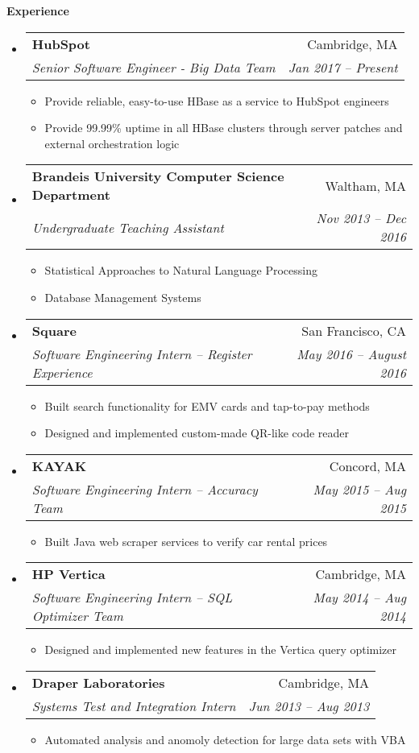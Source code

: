 \documentclass[letterpaper,11pt]{article}
\makeatletter
\newcommand{\resitem}[1]{\item #1 \vspace{-2pt}}
\newcommand{\resheading}[1]{{\large \colorbox{mygrey}{\begin{minipage}{\textwidth}{\textbf{#1 \vphantom{p\^{E}}}}\end{minipage}}}}
\newcommand{\ressubheading}[4]{
\begin{tabular*}{6.5in}{l@{\extracolsep{\fill}}r}
		\textbf{#1} & #2 \\
		\textit{#3} & \textit{#4} \\
\end{tabular*}\vspace{-6pt}}
\makeatother
\begin{document}
\resheading{Experience}
	\begin{itemize}
	
	    \item
            \ressubheading{HubSpot}{Cambridge, MA}
			{Senior Software Engineer - Big Data Team}{Jan 2017 -- Present}
			{\footnotesize
			\begin{itemize}
                \resitem{Provide reliable, easy-to-use HBase as a service to HubSpot engineers}
                \resitem{Provide 99.99\% uptime in all HBase clusters through server patches and external orchestration logic}
			\end{itemize}
			}
	    \item
            \ressubheading{Brandeis University Computer Science Department}{Waltham, MA}
			{Undergraduate Teaching Assistant}{Nov 2013 -- Dec 2016}
			{\footnotesize
			\begin{itemize}
                \resitem{Statistical Approaches to Natural Language Processing}
                \resitem{Database Management Systems}
			\end{itemize}
			}

		\item
            \ressubheading{Square}{San Francisco, CA}
            {Software Engineering Intern -- Register Experience}{May 2016 -- August 2016}
            {\footnotesize
            \begin{itemize}
                \resitem{Built search functionality for EMV cards and tap-to-pay methods}
                \resitem{Designed and implemented custom-made QR-like code reader}
            \end{itemize}
            }

	    \item
            \ressubheading{KAYAK}{Concord, MA}
            {Software Engineering Intern -- Accuracy Team}{May 2015 -- Aug 2015}
            {\footnotesize
            \begin{itemize}
                \resitem{Built Java web scraper services to verify car rental prices}
            \end{itemize}
            }

		\item
			\ressubheading{HP Vertica}{Cambridge, MA}
			{Software Engineering Intern -- SQL Optimizer Team}{May 2014 -- Aug 2014}
			{ \footnotesize
			\begin{itemize}
				\resitem{Designed and implemented new features in the Vertica query optimizer}
			\end{itemize}
			}
		\item
			\ressubheading{Draper Laboratories}{Cambridge, MA}
			    {Systems Test and Integration Intern}{Jun 2013 -- Aug 2013}
				{ \footnotesize
				\begin{itemize}
					\resitem{Automated analysis and anomoly detection for large data sets with VBA}
				\end{itemize}
				}

	\end{itemize}  %
\end{document}

